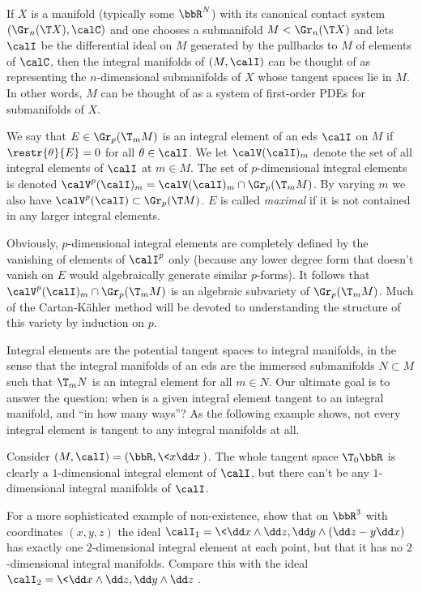 If $X$ is a manifold (typically some $\bbR^N$) with its canonical contact system $(\Gr_n(\T X),\calC)$ and one chooses a submanifold $M<\Gr_n(\T X)$ and lets $\calI$ be the differential ideal on $M$ generated by the pullbacks to $M$ of elements of $\calC$, then the integral manifolds of $(M,\calI)$ can be thought of as representing the $n$-dimensional submanifolds of $X$ whose tangent spaces lie in $M$. In other words, $M$ can be thought of as a system of first-order PDEs for submanifolds of $X$. 
 
\begin{defn}\label{def integral element}
    We say that $E\in \Gr_p(\T_m M)$ is an integral element of an \gls{eds} $\calI$ on $M$ if $\restr{\theta}{E}=0$ for all $\theta\in\calI$. We let $\calV(\calI)_m$ denote the set of all integral elements of $\calI$ at $m\in M$. The set of $p$-dimensional integral elements is denoted $\calV^p(\calI)_m=\calV(\calI)_m\cap \Gr_p(\T_m M)$. By varying $m$ we also have $\calV^p(\calI)\subset \Gr_p(\T M)$. $E$ is called \emph{maximal} if it is not contained in any larger integral elements.
\end{defn}

Obviously,  $p$-dimensional integral elements are completely defined by the vanishing of elements of $\calI^p$ only (because any lower degree form that doesn't vanish on $E$ would algebraically generate similar $p$-forms). It follows that $\calV^p(\calI)_m\cap \Gr_p (\T_m M)$ is an algebraic subvariety of $\Gr_p(\T_m M)$. Much of the Cartan-K\"ahler method will be devoted to understanding the structure of this variety by induction on $p$.

Integral elements are the potential tangent spaces to integral manifolds, in the sense that the integral manifolds of an \gls{eds} are the immersed submanifolds $N\subset M$ such that $\T_mN$ is an integral element for all $m\in N$. Our ultimate goal is to answer the question: when is a given integral element tangent to an integral manifold, and ``in how many ways''? As the following example shows, not every integral element is tangent to any integral manifolds at all.

\begin{example}
    Consider $(M,\calI)=(\bbR,\<x\dd x\>)$. The whole tangent space $\T_0 \bbR$ is clearly a $1$-dimensional integral element of $\calI$, but there can't be any $1$-dimensional integral manifolds of $\calI$.
\end{example}

\begin{xca}\label{xca 3.1 Bryant lec}
    For a more sophisticated example of non-existence, show that on $\bbR^3$ with coordinates $(x,y,z)$ the ideal $\calI_1=\<\dd x\wedge\dd z,\dd y\wedge(\dd z-y\dd x)\>$ has exactly one $2$-dimensional integral element at each point, but that it has no $2$-dimensional integral manifolds. Compare this with the ideal $\calI_2=\<\dd x\wedge\dd z,\dd y\wedge\dd z\>$.
\end{xca}

